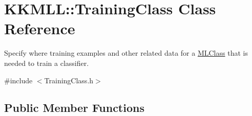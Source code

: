 \hypertarget{class_k_k_m_l_l_1_1_training_class}{}\section{K\+K\+M\+LL\+:\+:Training\+Class Class Reference}
\label{class_k_k_m_l_l_1_1_training_class}


Specify where training examples and other related data for a \hyperlink{class_k_k_m_l_l_1_1_m_l_class}{M\+L\+Class} that is needed to train a classifier.  




{\ttfamily \#include $<$Training\+Class.\+h$>$}

\subsection*{Public Member Functions}
